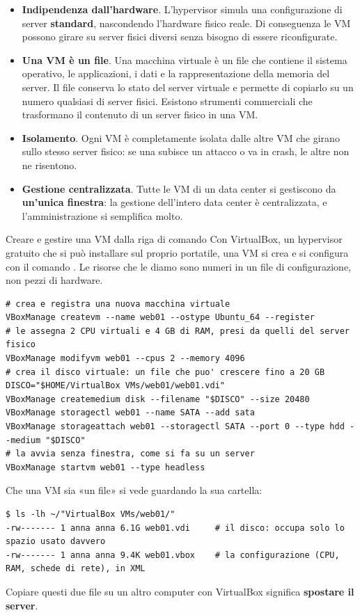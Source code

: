 \begin{itemize}
  \item \textbf{Indipendenza dall'hardware}. L'hypervisor simula una configurazione di server \textbf{standard}, nascondendo
        l'hardware fisico reale. Di conseguenza le VM possono girare su server fisici diversi senza bisogno di essere
        riconfigurate.
  \item \textbf{Una VM è un file}. Una macchina virtuale è un file che contiene il sistema operativo, le applicazioni, i
        dati e la rappresentazione della memoria del server. Il file conserva lo stato del server virtuale e permette di
        copiarlo su un numero qualsiasi di server fisici. Esistono strumenti commerciali che trasformano il contenuto di un
        server fisico in una VM.
  \item \textbf{Isolamento}. Ogni VM è completamente isolata dalle altre VM che girano sullo stesso server fisico: se una
        subisce un attacco o va in crash, le altre non ne risentono.
  \item \textbf{Gestione centralizzata}. Tutte le VM di un data center si gestiscono da \textbf{un'unica finestra}: la
        gestione dell'intero data center è centralizzata, e l'amministrazione si semplifica molto.
\end{itemize}

\begin{esempio}{Creare e gestire una VM dalla riga di comando}
Con VirtualBox, un hypervisor gratuito che si può installare sul proprio portatile, una VM si crea e si configura con il
comando . Le risorse che le diamo sono numeri in un file di configurazione, non pezzi di hardware.

\begin{lstlisting}[style=shell, name=crea-vm.sh]
# crea e registra una nuova macchina virtuale
VBoxManage createvm --name web01 --ostype Ubuntu_64 --register
# le assegna 2 CPU virtuali e 4 GB di RAM, presi da quelli del server fisico
VBoxManage modifyvm web01 --cpus 2 --memory 4096
# crea il disco virtuale: un file che puo' crescere fino a 20 GB
DISCO="$HOME/VirtualBox VMs/web01/web01.vdi"
VBoxManage createmedium disk --filename "$DISCO" --size 20480
VBoxManage storagectl web01 --name SATA --add sata
VBoxManage storageattach web01 --storagectl SATA --port 0 --type hdd --medium "$DISCO"
# la avvia senza finestra, come si fa su un server
VBoxManage startvm web01 --type headless
\end{lstlisting}

Che una VM sia «un file» si vede guardando la sua cartella:
\begin{lstlisting}[style=shell, name=Terminale]
$ ls -lh ~/"VirtualBox VMs/web01/"
-rw------- 1 anna anna 6.1G web01.vdi     # il disco: occupa solo lo spazio usato davvero
-rw------- 1 anna anna 9.4K web01.vbox    # la configurazione (CPU, RAM, schede di rete), in XML
\end{lstlisting}
Copiare questi due file su un altro computer con VirtualBox significa \textbf{spostare il server}.
\end{esempio}

